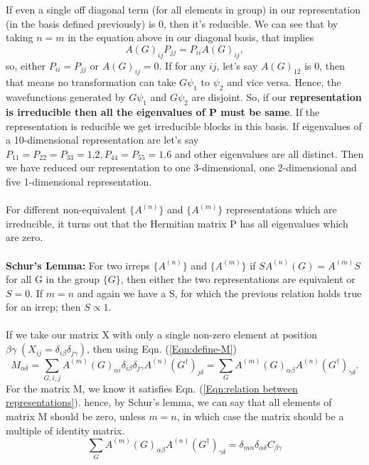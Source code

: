 \documentclass{article}
\begin{document}
	If even a single off diagonal term (for all elements in group) in our representation (in the basis defined previously) is 0, then it's reducible. We can see that by taking $n=m$ in the equation above in our diagonal basis, that implies
	\begin{equation}
		A(G)_{ij}P_{jj} = P_{ii} A(G)_{ij},
	\end{equation}
	so, either $P_{ii} = P_{jj}$ or $A(G)_{ij} = 0$. If for any $ij$, let's say $A(G)_{12}$ is 0, then that means no transformation can take $G\psi_1$ to $\psi_2$ and vice versa. Hence, the wavefunctions generated by $G\psi_1$ and $G\psi_2$ are disjoint. So, if our \textbf{representation is irreducible then all the eigenvalues of P must be same}. If the representation is reducible we get irreducible blocks in this basis. If eigenvalues of a 10-dimensional representation are let's say $P_{11} = P_{22} = P_{33} = 1.2, P_{44} = P_{55} = 1.6$ and other eigenvalues are all distinct. Then we have reduced our representation to one 3-dimensional, one 2-dimensional and five 1-dimensional representation.\\\\
	For different non-equivalent  $\{A^{(n)}\}$ and $\{A^{(m)}\}$ representations which are irreducible, it turns out that the Hermitian matrix P has all eigenvalues which are zero.\\ \\
	\textbf{Schur's Lemma:} For two irreps $\{A^{(n)}\}$ and $\{A^{(m)}\}$ if $S A^{(n)}(G) = A^{(m)} S$ for all G in the group $\{G\}$, then either the two representations are equivalent or $S = 0$. If $m = n$ and again we have a S, for which the previous relation holds true for an irrep; then $S \propto 1$.\\\\
	If we take our matrix X with only a single non-zero element at position $\beta \gamma \;(X_{ij} = \delta_{i\beta}\delta_{j\gamma})$, then using Eqn. (\ref{Eqn:define-M})
	\begin{equation}
		M_{\alpha \delta} = \sum_{G,i,j}A^{(m)}(G)_{\alpha i} \delta_{i\beta}\delta_{j\gamma} A^{(n)}(G^\dagger)_{j \delta} = \sum_{G}A^{(m)}(G)_{\alpha \beta}  A^{(n)}(G^\dagger)_{\gamma \delta}.
	\end{equation}
	For the matrix M, we know it satisfies Eqn. (\ref{Eqn:relation between representations}). hence, by Schur's lemma, we can say that all elements of matrix M should be zero, unless $m=n$, in which case the matrix should be a multiple of identity matrix.
	\begin{equation}
		\sum_{G}A^{(m)}(G)_{\alpha \beta}  A^{(n)}(G^\dagger)_{\gamma \delta} = \delta_{mn}\delta_{\alpha \delta} C_{\beta \gamma}
	\end{equation}
\end{document}
